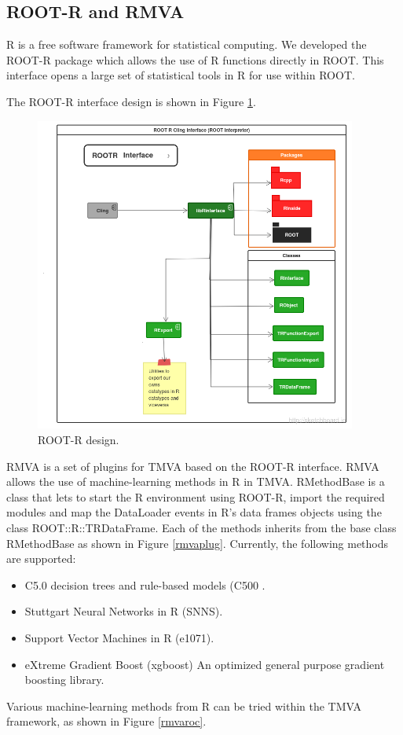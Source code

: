 \documentclass[a4paper]{jpconf}
\begin{document}
\clearpage
\subsection{ROOT-R and RMVA}\label{ROOTR}
R  is a free software framework for statistical computing\cite{R}. We developed the ROOT-R package which allows the  use of R functions directly in ROOT. This interface opens a large set of statistical tools in R for use within ROOT. 

The ROOT-R interface design is shown in Figure \ref{rootr:label}. 


\begin{figure}[h]
\centering
\includegraphics[width=25pc]{img/rootr.png}\caption{\label{rootr:label} ROOT-R design.}
\end{figure}

RMVA is a set of plugins for TMVA based on the ROOT-R interface. RMVA allows the use of machine-learning methods in R in TMVA.  
RMethodBase is a class that lets to start the R environment using ROOT-R, import the required modules and map the DataLoader events in R's data frames objects using the class ROOT::R::TRDataFrame.
Each of the methods inherits from the base class RMethodBase as shown in Figure \ref{rmvaplug}. Currently, the following methods are supported: 

\begin{itemize}  
\item C5.0 decision trees and rule-based models (C500 \cite{c50}.
\item Stuttgart Neural Networks in R (SNNS)\cite{rsnns}.
\item Support Vector Machines in R (e1071)\cite{e1071}.
\item eXtreme Gradient Boost (xgboost) An optimized
general purpose gradient boosting library\cite{chen2015xgboost}.
\end{itemize}
Various machine-learning methods from R can be tried within the TMVA framework, as shown in Figure \ref{rmvaroc}.
\end{document}
